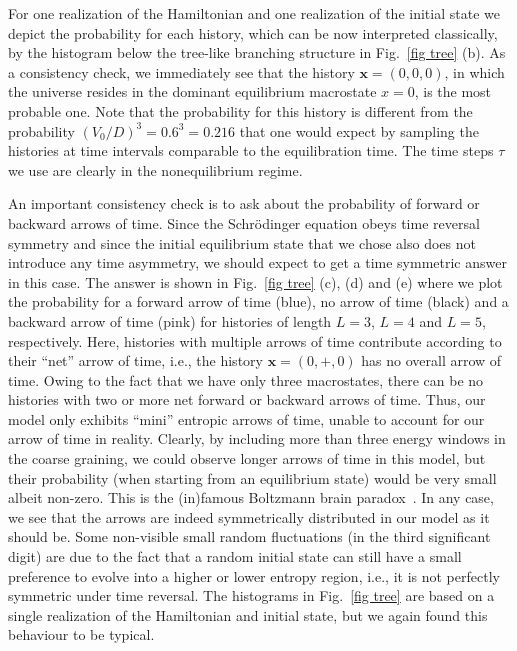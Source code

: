\documentclass[pre,onecolumn,12pt,aps,longbibliography,nofootinbib]{revtex4-2}
\newcommand{\bb}[1]{\textbf{#1}}
\newcommand{\blue}[1]{#1}
\begin{document}
For one realization of the Hamiltonian and one realization of the initial state we depict the probability for each 
history, which can be now interpreted classically, by the histogram below the tree-like branching structure in
Fig.~\ref{fig tree} (b). As a consistency check, we immediately see that the history $\bb x=(0,0,0)$, in which the
universe resides in the dominant equilibrium macrostate $x=0$, is the most probable one. Note that the probability
for this history is different from the probability $(V_0/D)^3 = 0.6^3= 0.216$ that one would expect by sampling the
histories at time intervals comparable to the equilibration time. The time steps $\tau$ we use are clearly in the nonequilibrium regime.

An important consistency check is to ask about the probability of forward or backward arrows of time. Since the Schr\"odinger equation obeys time reversal symmetry and since the initial equilibrium state that we chose also does not introduce any time asymmetry, we should expect to get a time symmetric answer in this case. The answer is shown in Fig.~\ref{fig tree} (c), (d) and (e) where we plot the probability for a forward arrow of time (blue), no arrow of time (black) and a backward arrow of time (pink) for histories of length $L=3$, $L=4$ and $L=5$, respectively. Here, histories with multiple arrows of time contribute according to their ``net'' arrow of time, i.e., the history $\bb x=(0,+,0)$ has no overall arrow of time. Owing to the fact that we have only three macrostates, there can be no histories with two or more net forward or backward arrows of time. \blue{Thus, our model only exhibits ``mini'' entropic arrows of time, unable to account for our arrow of time in reality. Clearly, by including more than three energy windows in the coarse graining, we could observe longer arrows of time in this model, but their probability (when starting from an equilibrium state) would be very small albeit non-zero. This is the (in)famous Boltzmann brain paradox~\cite{AlbrechtSorboPRD2004, CarrollInBook2020, MuellerQuantum2020}. In any case,} we see that the arrows are indeed symmetrically distributed in our model as it should be. Some non-visible small random fluctuations (in the third significant digit) are due to the fact that a random initial state can still have a small preference to evolve into a higher or lower entropy region, i.e., it is not perfectly symmetric under time reversal. The histograms in Fig.~\ref{fig tree} are based on a single realization of the Hamiltonian and initial state, but we again found this behaviour to be typical.
\end{document}
